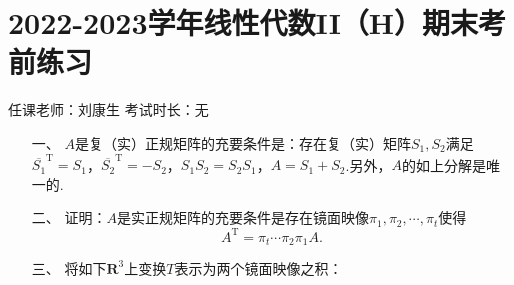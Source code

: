 \section*{2022-2023学年线性代数II（H）期末考前练习}

\begin{center}
    任课老师：刘康生\hspace{4em} 考试时长：无
\end{center}

\begin{enumerate}
	\item[一、]$A$是复（实）正规矩阵的充要条件是：存在复（实）矩阵$S_1,S_2$满足$\overline{S_1}^{\mathrm{T}}=S_1$，$\overline{S_2}^{\mathrm{T}}=-S_2$，$S_1S_2=S_2S_1$，$A=S_1+S_2$.另外，$A$的如上分解是唯一的.
	\item[二、]证明：$A$是实正规矩阵的充要条件是存在镜面映像$\pi_1,\pi_2,\cdots,\pi_t$使得
    \[A^\mathrm{T}=\pi_t\cdots\pi_2\pi_1A.\]
	\item[三、]将如下$\mathbf{R}^3$上变换$T$表示为两个镜面映像之积：


\end{enumerate}
